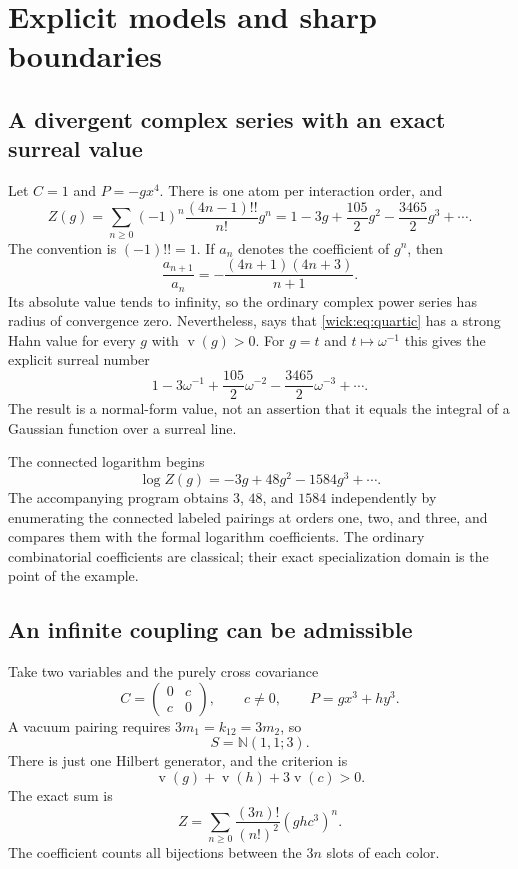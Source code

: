 \documentclass[11pt,letterpaper]{article}
\numberwithin{equation}{section}
\theoremstyle{definition}
\theoremstyle{remark}
\newcommand{\N}{\mathbb N}
\newcommand{\val}{\operatorname v}
\begin{document}
\section{Explicit models and sharp boundaries}
\label{wick:sec:examples}

\subsection{A divergent complex series with an exact surreal value}

Let $C=1$ and $P=-g x^4$. There is one atom per interaction order, and
\begin{equation}
 Z(g)=\sum_{n\ge0}(-1)^n\frac{(4n-1)!!}{n!}g^n
 =1-3g+\frac{105}{2}g^2-\frac{3465}{2}g^3+\cdots.
 \label{wick:eq:quartic}
\end{equation}
The convention is $(-1)!!=1$. If $a_n$ denotes the coefficient of $g^n$,
then
\[
 \frac{a_{n+1}}{a_n}
 =-\frac{(4n+1)(4n+3)}{n+1}.
\]
Its absolute value tends to infinity, so the ordinary complex power series
has radius of convergence zero. Nevertheless,  says that
\eqref{wick:eq:quartic} has a strong Hahn value for every $g$ with $\val(g)>0$.
For $g=t$ and $t\mapsto\omega^{-1}$ this gives the explicit surreal number
\[
 1-3\omega^{-1}+\frac{105}{2}\omega^{-2}
 -\frac{3465}{2}\omega^{-3}+\cdots.
\]
The result is a normal-form value, not an assertion that it equals the
integral of a Gaussian function over a surreal line.

The connected logarithm begins
\begin{equation}
 \log Z(g)=-3g+48g^2-1584g^3+\cdots.
 \label{wick:eq:quarticlog}
\end{equation}
The accompanying program obtains $3$, $48$, and $1584$ independently by
enumerating the connected labeled pairings at orders one, two, and three,
and compares them with the formal logarithm coefficients. The ordinary
combinatorial coefficients are classical; their exact specialization domain
is the point of the example.

\subsection{An infinite coupling can be admissible}
\label{wick:sec:cubic}

Take two variables and the purely cross covariance
\[
 C=\begin{pmatrix}0&c\\c&0\end{pmatrix},\qquad c\ne0,
 \qquad P=gx^3+hy^3.
\]
A vacuum pairing requires $3m_1=k_{12}=3m_2$, so
\[
 S=\N(1,1;3).
\]
There is just one Hilbert generator, and the criterion is
\begin{equation}
 \val(g)+\val(h)+3\val(c)>0.
 \label{wick:eq:cubiccriterion}
\end{equation}
The exact sum is
\begin{equation}
 Z=\sum_{n\ge0}\frac{(3n)!}{(n!)^2}(ghc^3)^n.
 \label{wick:eq:cubicZ}
\end{equation}
The coefficient counts all bijections between the $3n$ slots of each color.
\end{document}
